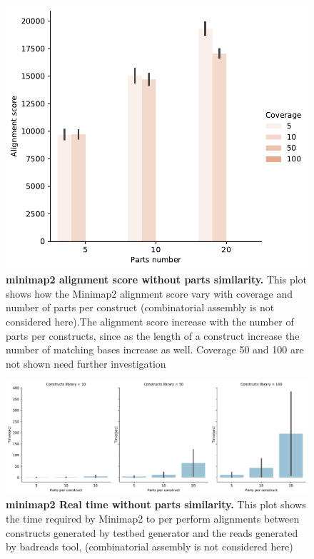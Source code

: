 \documentclass[11pt, a4paper]{article}
\begin{document}
  \begin{figure}[ht]
    \begin{center}
    \includegraphics[width=1\textwidth]{../results/images_notebook/v_400/minimap_sim_00_alignment_score.pdf}
    \end{center}
    \caption{{\bf  minimap2 alignment score without parts similarity.} This plot shows how the Minimap2 alignment score vary with coverage and number of parts per construct (combinatorial assembly is not considered here).The alignment score increase with the number of parts per constructs, since as the length of a construct increase the number of matching bases increase as well. Coverage 50 and 100 are not shown need further investigation}
   \label{fig:v_400_alignment_score_sim_0}
\end{figure}

\begin{figure}[ht]
   \begin{center}
    \includegraphics[width=1.35\textwidth]{../results/images_notebook/v_400/minimap_sim_00_real_time.pdf}
    \end{center}
    \caption{{\bf  minimap2 Real time without parts similarity.} This plot shows the time required by Minimap2 to per perform alignments between constructs generated by testbed generator and the reads generated by badreads tool,
    (combinatorial assembly is not considered here)}
   \label{fig:v_400_time_sim_0}
 \end{figure}
\end{document}
